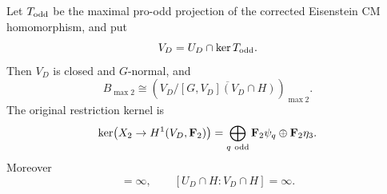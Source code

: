 \begin{theorem}
\label{thm:joint-odd-cm-gate}
Let \(T_{\rm odd}\) be the maximal pro-odd projection of the
corrected Eisenstein CM homomorphism, and put
\[
                       V_D=U_D\cap\ker T_{\rm odd}.
\]
Then \(V_D\) is closed and \(G\)-normal, and
\begin{equation}
 B_{\max2}\cong
 \left(V_D/\overline{[G,V_D](V_D\cap H)}\right)_{\max2}.
                                                               \label{eq:joint-odd-cm-1}
\end{equation}
The original restriction kernel is
\begin{equation}
 \ker\bigl(X_2\to H^1(V_D,\mathbf F_2)\bigr)
   =\bigoplus_{q\ {\rm odd}}\mathbf F_2\psi_q
                            \oplus\mathbf F_2\eta_3.    \label{eq:joint-odd-cm-2}
\end{equation}
Moreover
\begin{equation}
 [U_D:V_D]=\infty,\qquad
 [U_D\cap H:V_D\cap H]=\infty.                          \label{eq:joint-odd-cm-3}
\end{equation}
\end{theorem}

